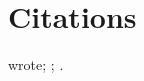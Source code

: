 \documentclass{article}
\begin{document}
\section{Citations}
\textcite{knuth84} wrote; \autocite{lamport94,cousot77}; \parencite[12]{turing36}. \nocite{doe20}
\printbibliography
\end{document}

